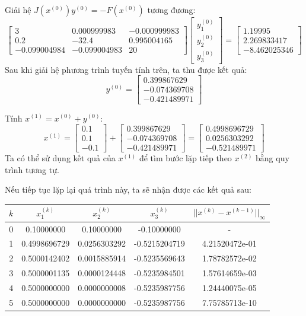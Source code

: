 Giải hệ $J(x^{(0)})y^{(0)} = -F(x^{(0)})$ tương đương:
\[
\begin{bmatrix}
3 & 0.000999983 & -0.000999983 \\
0.2 & -32.4 & 0.995004165 \\
-0.099004984 & -0.099004983 & 20
\end{bmatrix}
\begin{bmatrix} y_{1}^{(0)} \\ y_{2}^{(0)} \\ y_{3}^{(0)} \end{bmatrix}
= \begin{bmatrix}
1.19995 \\
2.269833417 \\
-8.462025346
\end{bmatrix}
\]
Sau khi giải hệ phương trình tuyến tính trên, ta thu được kết quả:
\[
y^{(0)} = \begin{bmatrix}
0.399867629 \\
-0.074369708 \\
-0.421489971
\end{bmatrix}
\]

Tính $x^{(1)} = x^{(0)} + y^{(0)}$:
\[
x^{(1)} = \begin{bmatrix} 0.1 \\ 0.1 \\ -0.1 \end{bmatrix} + \begin{bmatrix} 0.399867629 \\
-0.074369708 \\
-0.421489971 \end{bmatrix}
= \begin{bmatrix} 0.4998696729 \\ 0.0256303292 \\ -0.521489971\end{bmatrix}
\]
Ta có thể sử dụng kết quả của $x^{(1)}$ để tìm bước lặp tiếp theo $x^{(2)}$ bằng quy trình tương tự.

Nếu tiếp tục lặp lại quá trình này, ta sẽ nhận được các kết quả sau:

\begin{table}[h]
\centering
\begin{tabular}{|c|c|c|c|c|}
\hline
\textbf{$k$} & \textbf{$x_{1}^{(k)}$} & \textbf{$x_{2}^{(k)}$} & \textbf{$x_{3}^{(k)}$} & \textbf{$||x^{(k)} - x^{(k-1)}||_\infty$} \\
\hline
0 & 0.10000000 & 0.10000000 & -0.10000000 & - \\
1 & 0.4998696729 & 0.0256303292 & -0.5215204719 & 4.21520472e-01 \\
2 & 0.5000142402 & 0.0015885914 & -0.5235569643 &1.78782572e-02 \\
3 & 0.5000001135 & 0.0000124448 & -0.5235984501 &1.57614659e-03 \\
4 & 0.5000000000 & 0.0000000008 & -0.5235987756 &1.24440075e-05 \\
5 & 0.5000000000 & 0.0000000000 & -0.5235987756 &7.75785713e-10 \\
\hline
\end{tabular}
\end{table}

